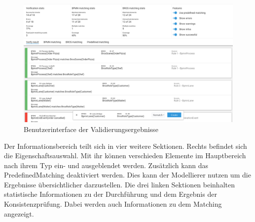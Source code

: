 \begin{figure}
    \centering
    \includegraphics[width=\textwidth,keepaspectratio]{../images/Screenshot-Result.png}%
    \caption{Benutzerinterface der Validierungsergebnisse}%
    \label{fig:screenshot-result}
\end{figure}

Der Informationsbereich teilt sich in vier weitere Sektionen.
Rechts befindet sich die Eigenschaftsauswahl.
Mit ihr können verschieden Elemente im Hauptbereich nach ihrem Typ ein- und ausgeblendet werden.
Zusätzlich kann das PredefinedMatching deaktiviert werden.
Dies kann der Modellierer nutzen um die Ergebnisse übersichtlicher darzustellen.
Die drei linken Sektionen beinhalten statistische Informationen zu der Durchführung und dem Ergebnis der Konsistenzprüfung.
Dabei werden auch Informationen zu dem Matching angezeigt.

